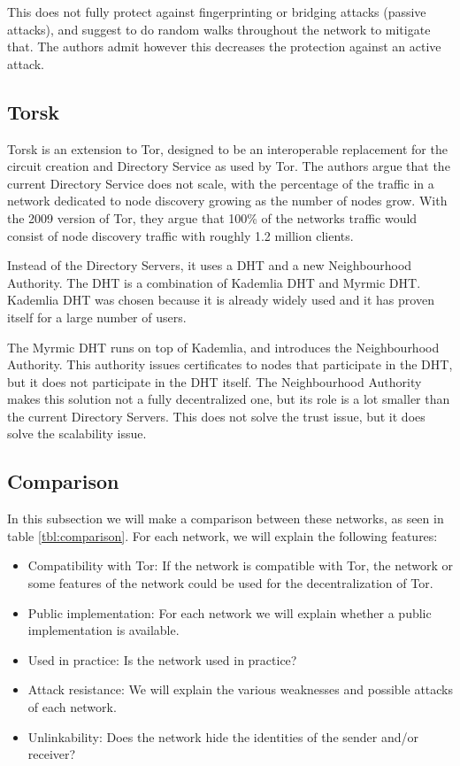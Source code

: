 \documentclass{article}
\begin{document}
		This does not fully protect against fingerprinting or bridging attacks (passive attacks), and suggest to do random walks throughout the network to mitigate that. The authors admit however this decreases the protection against an active attack.
		
	\subsection{Torsk} %
		Torsk \cite{mclachlan2009scalable} is an extension to Tor, designed to be an interoperable replacement for the circuit creation and Directory Service as used by Tor. The authors argue that the current Directory Service does not scale, with the percentage of the traffic in a network dedicated to node discovery growing as the number of nodes grow. With the 2009 version of Tor, they argue that 100\% of the networks traffic would consist of node discovery traffic with roughly 1.2 million clients. 
		
		Instead of the Directory Servers, it uses a DHT and a new Neighbourhood Authority. The DHT is a combination of Kademlia DHT and Myrmic DHT. Kademlia DHT was chosen because it is already widely used and it has proven itself for a large number of users.
		
		The Myrmic DHT runs on top of Kademlia, and introduces the Neighbourhood Authority. This authority issues certificates to nodes that participate in the DHT, but it does not participate in the DHT itself. The Neighbourhood Authority makes this solution not a fully decentralized one, but its role is a lot smaller than the current Directory Servers. This does not solve the trust issue, but it does solve the scalability issue.

	\subsection{Comparison}
		In this subsection we will make a comparison between these networks, as seen in table \ref{tbl:comparison}. For each network, we will explain the following features:
	
		\begin{itemize}
			\item{Compatibility with Tor:} If the network is compatible with Tor, the network or some features of the network could be used for the decentralization of Tor.
			\item{Public implementation:} For each network we will explain whether a public implementation is available.
			\item{Used in practice:} Is the network used in practice?
			\item{Attack resistance:} We will explain the various weaknesses and possible attacks of each network.
			\item{Unlinkability:} Does the network hide the identities of the sender and/or receiver?
		\end{itemize}
		
\end{document}
